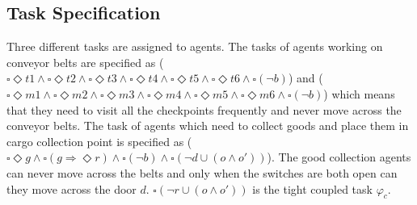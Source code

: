 \documentclass[journal]{IEEEtran}
\begin{document}
\subsection{Task Specification}
Three different tasks are assigned to agents. The tasks of agents working on conveyor belts are specified as ($\square\Diamond t1 \wedge \square\Diamond t2 \wedge \square\Diamond t3 \wedge \square\Diamond t4 \wedge \square\Diamond t5 \wedge \square\Diamond t6 \wedge \square(\neg b)$) and ($\square\Diamond m1 \wedge \square\Diamond m2 \wedge \square\Diamond m3 \wedge \square\Diamond m4 \wedge \square\Diamond m5 \wedge \square\Diamond m6 \wedge \square(\neg b)$) which means that they need to visit all the checkpoints frequently and never move across the conveyor belts. The task of agents which need to collect goods and place them in cargo collection point is specified as ($\square\Diamond g \wedge \square(g\Longrightarrow \Diamond r) \wedge \square(\neg b) \wedge \square(\neg d \cup (o \wedge o'))$). The good collection agents can never move across the belts and only when the switches are both open can they move across the door $d$. $\square(\neg r \cup (o \wedge o'))$ is the tight coupled task $\varphi_c$.
\end{document}
